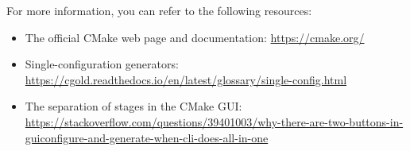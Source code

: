 

For more information, you can refer to the following resources:

\begin{itemize}
\item 
The official CMake web page and documentation: \url{https://cmake.org/}

\item 
Single-configuration generators: \url{https://cgold.readthedocs.io/en/latest/glossary/single-config.html}

\item 
The separation of stages in the CMake GUI: \url{https://stackoverflow.com/questions/39401003/why-there-are-two-buttons-in-guiconfigure-and-generate-when-cli-does-all-in-one}
\end{itemize}